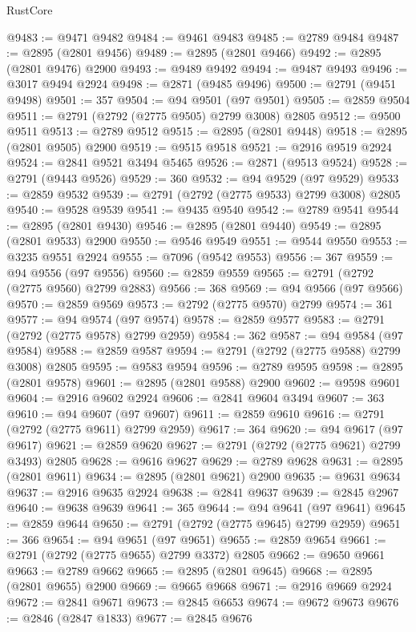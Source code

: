 \begin{lexlean}{RustCore}
\begin{coremodule}
@9483 := @9471 @9482
@9484 := @9461 @9483
@9485 := @2789 @9484
@9487 := @2895 (@2801 @9456)
@9489 := @2895 (@2801 @9466)
@9492 := @2895 (@2801 @9476) @2900
@9493 := @9489 @9492
@9494 := @9487 @9493
@9496 := @3017 @9494 @2924
@9498 := @2871 (@9485 @9496)
@9500 := @2791 (@9451 @9498)
@9501 := 357
@9504 := @94 @9501 (@97 @9501)
@9505 := @2859 @9504
@9511 := @2791 (@2792 (@2775 @9505) @2799 @3008) @2805
@9512 := @9500 @9511
@9513 := @2789 @9512
@9515 := @2895 (@2801 @9448)
@9518 := @2895 (@2801 @9505) @2900
@9519 := @9515 @9518
@9521 := @2916 @9519 @2924
@9524 := @2841 @9521 @3494 @5465
@9526 := @2871 (@9513 @9524)
@9528 := @2791 (@9443 @9526)
@9529 := 360
@9532 := @94 @9529 (@97 @9529)
@9533 := @2859 @9532
@9539 := @2791 (@2792 (@2775 @9533) @2799 @3008) @2805
@9540 := @9528 @9539
@9541 := @9435 @9540
@9542 := @2789 @9541
@9544 := @2895 (@2801 @9430)
@9546 := @2895 (@2801 @9440)
@9549 := @2895 (@2801 @9533) @2900
@9550 := @9546 @9549
@9551 := @9544 @9550
@9553 := @3235 @9551 @2924
@9555 := @7096 (@9542 @9553)
@9556 := 367
@9559 := @94 @9556 (@97 @9556)
@9560 := @2859 @9559
@9565 := @2791 (@2792 (@2775 @9560) @2799 @2883)
@9566 := 368
@9569 := @94 @9566 (@97 @9566)
@9570 := @2859 @9569
@9573 := @2792 (@2775 @9570) @2799
@9574 := 361
@9577 := @94 @9574 (@97 @9574)
@9578 := @2859 @9577
@9583 := @2791 (@2792 (@2775 @9578) @2799 @2959)
@9584 := 362
@9587 := @94 @9584 (@97 @9584)
@9588 := @2859 @9587
@9594 := @2791 (@2792 (@2775 @9588) @2799 @3008) @2805
@9595 := @9583 @9594
@9596 := @2789 @9595
@9598 := @2895 (@2801 @9578)
@9601 := @2895 (@2801 @9588) @2900
@9602 := @9598 @9601
@9604 := @2916 @9602 @2924
@9606 := @2841 @9604 @3494
@9607 := 363
@9610 := @94 @9607 (@97 @9607)
@9611 := @2859 @9610
@9616 := @2791 (@2792 (@2775 @9611) @2799 @2959)
@9617 := 364
@9620 := @94 @9617 (@97 @9617)
@9621 := @2859 @9620
@9627 := @2791 (@2792 (@2775 @9621) @2799 @3493) @2805
@9628 := @9616 @9627
@9629 := @2789 @9628
@9631 := @2895 (@2801 @9611)
@9634 := @2895 (@2801 @9621) @2900
@9635 := @9631 @9634
@9637 := @2916 @9635 @2924
@9638 := @2841 @9637
@9639 := @2845 @2967
@9640 := @9638 @9639
@9641 := 365
@9644 := @94 @9641 (@97 @9641)
@9645 := @2859 @9644
@9650 := @2791 (@2792 (@2775 @9645) @2799 @2959)
@9651 := 366
@9654 := @94 @9651 (@97 @9651)
@9655 := @2859 @9654
@9661 := @2791 (@2792 (@2775 @9655) @2799 @3372) @2805
@9662 := @9650 @9661
@9663 := @2789 @9662
@9665 := @2895 (@2801 @9645)
@9668 := @2895 (@2801 @9655) @2900
@9669 := @9665 @9668
@9671 := @2916 @9669 @2924
@9672 := @2841 @9671
@9673 := @2845 @6653
@9674 := @9672 @9673
@9676 := @2846 (@2847 @1833)
@9677 := @2845 @9676

\end{coremodule}
\end{lexlean}
